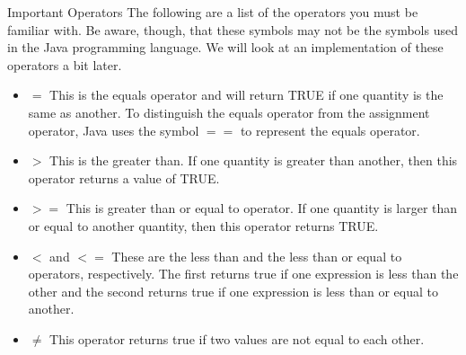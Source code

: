 	\begin{positiveInformation}{Important Operators}
		The following are a list of the operators you must be familiar with. Be aware, though, that these symbols may not be the symbols used in the Java programming language. We will look at an implementation of these operators a bit later.
			\begin{itemize}
				\item $=$ This is the equals operator and will return TRUE if one quantity is the same as another. To distinguish the equals operator from the assignment operator, Java uses the symbol $==$ to represent the equals operator.
				\item $>$ This is the greater than. If one quantity is greater than another, then this operator returns a value of TRUE.
				\item $>=$ This is greater than or equal to operator. If one quantity is larger than or equal to another quantity, then this operator returns TRUE.
				\item $<$ and $<=$ These are the less than and the less than or equal to operators, respectively. The first returns true if one expression is less than the other and the second returns true if one expression is less than or equal to another.
				\item $\neq$ This operator returns true if two values are not equal to each other.
			\end{itemize}
	\end{positiveInformation}



